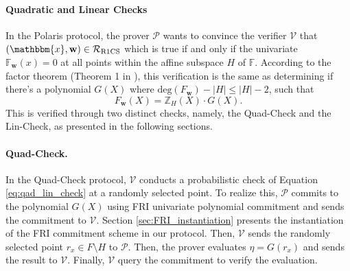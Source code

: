 





\paragraph{Quadratic and Linear Checks}\label{linquad}

In the Polaris protocol, the prover $\mathcal{P}$ wants to convince the verifier $\mathcal{V}$ that $(\mathbbm{x},\textbf{w})\in\mathcal{R}_{\mathrm{R1CS}}$ which is true if and only if the univariate  $\mathbb{F}_\textbf{w}(x) = 0$ at all points within the affine subspace $H$ of $\mathbb{F}$. According to the factor theorem (Theorem 1 in \cite{Polaris}), this verification is the same as determining if there's a polynomial $G(X)$ where $\text{deg}(F_\textbf{w}) - |H| \leq |H| - 2$, such that 
\begin{equation}
	F_\textbf{w}(X) = \mathbb{Z}_H(X) \cdot G(X).
	\label{eq:qad_lin_check}
\end{equation}
This is verified through two distinct checks, namely, the Quad-Check and the Lin-Check, as presented in the following sections.



\paragraph{Quad-Check.}\label{quad}

In the Quad-Check protocol, $\mathcal{V}$ conducts a probabilistic check of Equation \eqref{eq:qad_lin_check} at a randomly selected point. To realize this, $\mathcal{P}$ commits to the polynomial $G(X)$ using FRI univariate polynomial commitment and sends the commitment to $\mathcal{V}$. Section \ref{sec:FRI_instantiation} presents the instantiation of the FRI commitment scheme in our protocol. Then, $\mathcal{V}$ sends the randomly selected point $r_x \in F \setminus H$ to $\mathcal{P}$. Then, the prover evaluates $\eta = G (r_x)$ and sends the result to $\mathcal{V}$. Finally, $\mathcal{V}$ query the commitment to verify the evaluation. 

